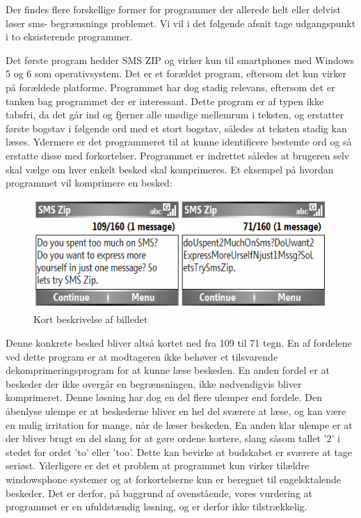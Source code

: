 Der findes flere forskellige former for programmer der allerede helt eller delvist løser sms- begrænsnings problemet. Vi vil i det følgende afsnit tage udgangspunkt i to eksisterende programmer.

Det første program hedder SMS ZIP og virker kun til smartphones med Windows 5 og 6 som operativsystem. Det er et forældet program, eftersom det kun virker på forældede platforme. Programmet har dog stadig relevans,  eftersom det er tanken bag programmet der er interessant. Dette program er af typen ikke tabsfri, da det går ind og fjerner alle unødige mellemrum i teksten, og erstatter første bogstav i følgende ord med et stort bogstav, således at teksten stadig kan læses. Ydermere er det programmeret til at kunne identificere bestemte ord og så erstatte disse med forkortelser. Programmet er indrettet således at brugeren selv skal vælge om hver enkelt besked skal komprimeres. Et eksempel på hvordan programmet vil komprimere en besked: \cite{download-sms} 

\begin{figure}[H]
\includegraphics []{Billeder/SMSZIP.png}
\caption {Kort beskrivelse af billedet}
\end{figure}

Denne konkrete besked bliver altså kortet ned fra 109 til 71 tegn. En af fordelene ved dette program er at modtageren ikke behøver et tilsvarende dekomprimeringsprogram for at kunne læse beskeden. En anden fordel er at beskeder der ikke overgår en begrænsningen, ikke nødvendigvis bliver komprimeret. Denne løsning har dog en del flere ulemper end fordele. Den åbenlyse ulempe er at beskederne bliver en hel del sværere at læse, og kan være en mulig irritation for mange, når de læser beskeden. En anden klar ulempe er at der bliver brugt en del slang for at gøre ordene kortere, slang såsom tallet '2' i stedet for ordet 'to' eller 'too'. Dette kan bevirke at budskabet er sværere at tage seriøst. Yderligere er det et problem at programmet kun virker tilældre windowsphone systemer og at forkortelserne kun er beregnet til engelsktalende beskeder. Det er derfor, på baggrund af ovenstående, vores vurdering at programmet er en ufuldstændig løsning, og er derfor ikke tilstrækkelig.\cite{download-sms}

